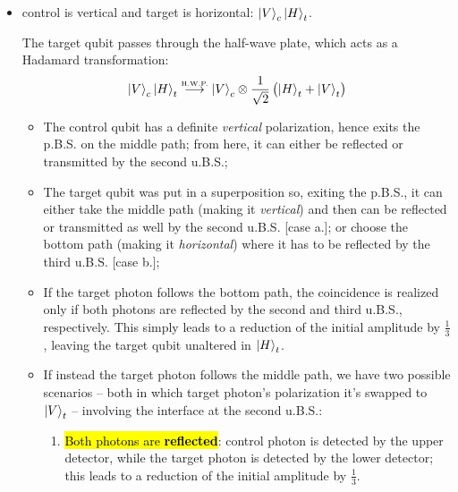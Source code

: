 \begin{itemize}
\item[\textbf{CASE \Rnum{3}:}] control is vertical and target is horizontal: $\ket{V}_c\ket{H}_t$.

The target qubit passes through the half-wave plate, which acts as a Hadamard transformation:
\begin{equation}
\ket{V}_c\ket{H}_t 
\stackrel{\text{\tiny{H.W.P.}}}{\longrightarrow}
\ket{V}_c 
\otimes
\frac{1}{\sqrt{2}}\,
\bigl( \ket{H}_t+\ket{V}_t\bigr)
\end{equation}

\begin{itemize}
    \item The control qubit has a definite \emph{vertical} polarization, hence exits the p.B.S. on the middle path; from here, it can either be reflected or transmitted by the second u.B.S.;
    \item The target qubit was put in a superposition so, exiting the p.B.S., it can either take the middle path (making it \emph{vertical}) and then can be reflected or transmitted as well by the second u.B.S. [case \hspace{0.2ex}a.]; or choose the bottom path (making it \emph{horizontal}) where it has to be reflected by the third u.B.S. [case \hspace{0.2ex}b.];
\end{itemize}

\begin{itemize}

\item[\textbf{\Rnum{3}\hspace{0.2ex}b.}] If the target photon follows the bottom path, the coincidence is realized only if both photons are reflected by the second and third u.B.S., respectively. This simply leads to a reduction of the initial amplitude by $\frac{1}{3}$, leaving the target qubit unaltered in $\ket{H}_t$.

\item[\textbf{\Rnum{3}\hspace{0.2ex}a.}] If instead the target photon follows the middle path, we have two possible scenarios -- both in which target photon's polarization it's swapped to $\ket{V}_t$ -- involving the interface at the second u.B.S.:

\begin{enumerate}
    \item \hl{Both photons are \textbf{reflected}}: control photon is detected by the upper detector, while the target photon is detected by the lower detector; this leads to a reduction of the initial amplitude by $\frac{1}{3}$.
    

\end{enumerate}
\end{itemize}
\end{itemize}
